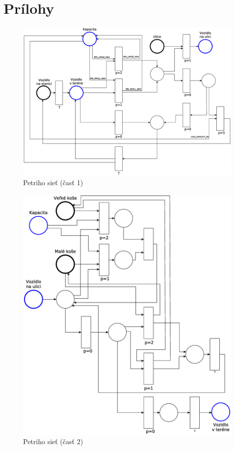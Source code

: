 \documentclass[11pt,a4paper]{article}
\begin{document}
\newpage
\section{Prílohy}

\begin{figure}[h]
    \center
    \includegraphics[scale=0.35]{../pn/pn-part1.eps}
    \caption{Petriho sieť (časť 1)}
    \label{PN-P1}
\end{figure}

\begin{figure}[H]
    \center
    \includegraphics[scale=0.4]{../pn/pn-part2.eps}
    \caption{Petriho sieť (časť 2)}
    \label{PN-P2}
\end{figure}

\newpage %

\makeatletter
\makeatother

\begin{flushleft}
    
\end{flushleft}
\end{document}
